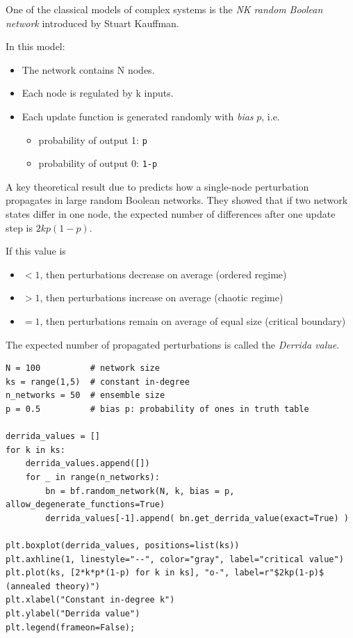 \documentclass[
]{article}
\providecommand{\tightlist}{%
  \setlength{\itemsep}{0pt}\setlength{\parskip}{0pt}}
\begin{document}
One of the classical models of complex systems is the \emph{NK random
Boolean network} introduced by Stuart Kauffman.

In this model:

\begin{itemize}
\item
  The network contains N nodes.
\item
  Each node is regulated by k inputs.
\item
  Each update function is generated randomly with \emph{bias} \(p\),
  i.e.

  \begin{itemize}
  \tightlist
  \item
    probability of output 1: \texttt{p}
  \item
    probability of output 0: \texttt{1-p}
  \end{itemize}
\end{itemize}

A key theoretical result due to \citet{derrida1986random} predicts how a
single-node perturbation propagates in large random Boolean networks.
They showed that if two network states differ in one node, the expected
number of differences after one update step is \(2kp(1-p)\).

If this value is

\begin{itemize}
\tightlist
\item
  \(< 1\), then perturbations decrease on average (ordered regime)
\item
  \(> 1\), then perturbations increase on average (chaotic regime)
\item
  \(= 1\), then perturbations remain on average of equal size (critical
  boundary)
\end{itemize}

The expected number of propagated perturbations is called the
\emph{Derrida value}.

\begin{lstlisting}
N = 100          # network size
ks = range(1,5)  # constant in-degree
n_networks = 50  # ensemble size
p = 0.5          # bias p: probability of ones in truth table

derrida_values = []
for k in ks:
    derrida_values.append([])
    for _ in range(n_networks):
        bn = bf.random_network(N, k, bias = p, allow_degenerate_functions=True)
        derrida_values[-1].append( bn.get_derrida_value(exact=True) )

plt.boxplot(derrida_values, positions=list(ks))
plt.axhline(1, linestyle="--", color="gray", label="critical value")
plt.plot(ks, [2*k*p*(1-p) for k in ks], "o-", label=r"$2kp(1-p)$ (annealed theory)")
plt.xlabel("Constant in-degree k")
plt.ylabel("Derrida value")
plt.legend(frameon=False);
\end{lstlisting}
\end{document}

